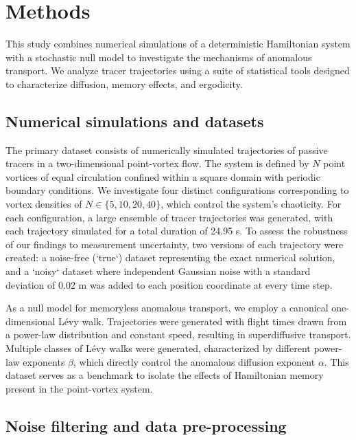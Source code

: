 \documentclass[]{article}
\begin{document}
\section{Methods}
\label{sec:methods}
This study combines numerical simulations of a deterministic Hamiltonian system with a stochastic null model to investigate the mechanisms of anomalous transport. We analyze tracer trajectories using a suite of statistical tools designed to characterize diffusion, memory effects, and ergodicity.

\subsection{Numerical simulations and datasets}

The primary dataset consists of numerically simulated trajectories of passive tracers in a two-dimensional point-vortex flow. The system is defined by $N$ point vortices of equal circulation confined within a square domain with periodic boundary conditions. We investigate four distinct configurations corresponding to vortex densities of $N \in \{5, 10, 20, 40\}$, which control the system's chaoticity. For each configuration, a large ensemble of tracer trajectories was generated, with each trajectory simulated for a total duration of 24.95 s. To assess the robustness of our findings to measurement uncertainty, two versions of each trajectory were created: a noise-free (`true`) dataset representing the exact numerical solution, and a `noisy` dataset where independent Gaussian noise with a standard deviation of 0.02 m was added to each position coordinate at every time step.

As a null model for memoryless anomalous transport, we employ a canonical one-dimensional L\'evy walk. Trajectories were generated with flight times drawn from a power-law distribution and constant speed, resulting in superdiffusive transport. Multiple classes of L\'evy walks were generated, characterized by different power-law exponents $\beta$, which directly control the anomalous diffusion exponent $\alpha$. This dataset serves as a benchmark to isolate the effects of Hamiltonian memory present in the point-vortex system.

\subsection{Noise filtering and data pre-processing}
\end{document}
